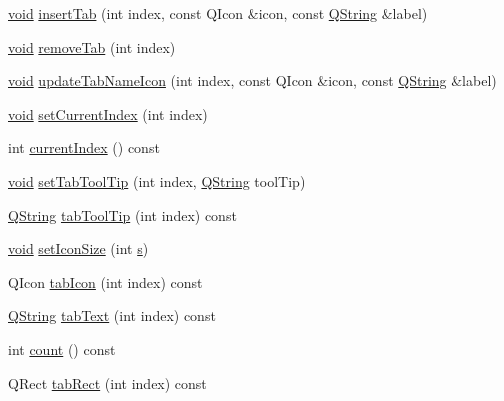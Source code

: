 \begin{DoxyCompactItemize}
\item 
\hyperlink{group___u_a_v_objects_plugin_ga444cf2ff3f0ecbe028adce838d373f5c}{void} \hyperlink{group___core_plugin_ga2be27a6b256583dba3135713105716d7}{insert\-Tab} (int index, const \-Q\-Icon \&icon, const \hyperlink{group___u_a_v_objects_plugin_gab9d252f49c333c94a72f97ce3105a32d}{\-Q\-String} \&label)
\item 
\hyperlink{group___u_a_v_objects_plugin_ga444cf2ff3f0ecbe028adce838d373f5c}{void} \hyperlink{group___core_plugin_ga7d95a77577d78a5b71c4ef00a84f64e6}{remove\-Tab} (int index)
\item 
\hyperlink{group___u_a_v_objects_plugin_ga444cf2ff3f0ecbe028adce838d373f5c}{void} \hyperlink{group___core_plugin_ga2395ca4b2340f7f5e54d4fada4e0e929}{update\-Tab\-Name\-Icon} (int index, const \-Q\-Icon \&icon, const \hyperlink{group___u_a_v_objects_plugin_gab9d252f49c333c94a72f97ce3105a32d}{\-Q\-String} \&label)
\item 
\hyperlink{group___u_a_v_objects_plugin_ga444cf2ff3f0ecbe028adce838d373f5c}{void} \hyperlink{group___core_plugin_gabf70f3132174e9d8c21315e2684150de}{set\-Current\-Index} (int index)
\item 
int \hyperlink{group___core_plugin_ga1c8e8bf3903f524c59131dcabb31a913}{current\-Index} () const 
\item 
\hyperlink{group___u_a_v_objects_plugin_ga444cf2ff3f0ecbe028adce838d373f5c}{void} \hyperlink{group___core_plugin_gaeb89740bb137bced7ecb998d565ecc5f}{set\-Tab\-Tool\-Tip} (int index, \hyperlink{group___u_a_v_objects_plugin_gab9d252f49c333c94a72f97ce3105a32d}{\-Q\-String} tool\-Tip)
\item 
\hyperlink{group___u_a_v_objects_plugin_gab9d252f49c333c94a72f97ce3105a32d}{\-Q\-String} \hyperlink{group___core_plugin_gad418288c9fa961c782d6bf2171180bec}{tab\-Tool\-Tip} (int index) const 
\item 
\hyperlink{group___u_a_v_objects_plugin_ga444cf2ff3f0ecbe028adce838d373f5c}{void} \hyperlink{group___core_plugin_ga0a48234ad92fee352aaaef4796c49892}{set\-Icon\-Size} (int \hyperlink{uavobjecttemplate_8m_a3691308f2a4c2f6983f2880d32e29c84}{s})
\item 
\-Q\-Icon \hyperlink{group___core_plugin_ga9417afde2ee68f8fe8074235c10e8566}{tab\-Icon} (int index) const 
\item 
\hyperlink{group___u_a_v_objects_plugin_gab9d252f49c333c94a72f97ce3105a32d}{\-Q\-String} \hyperlink{group___core_plugin_ga27be53a0b602c30ace273f7e3b10612a}{tab\-Text} (int index) const 
\item 
int \hyperlink{group___core_plugin_ga6d406edf7fec053848aeced489074d72}{count} () const 
\item 
\-Q\-Rect \hyperlink{group___core_plugin_ga73860a10ee1c7ab8ecc257d227287058}{tab\-Rect} (int index) const 
\end{DoxyCompactItemize}



